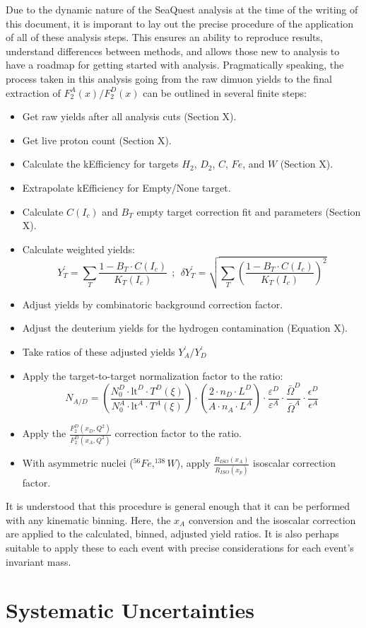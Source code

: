 Due to the dynamic nature of the SeaQuest analysis at the time of the writing of this document, it is imporant to lay out the precise procedure of the application of all of these analysis steps. This ensures an ability to reproduce results, understand differences between methods, and allows those new to analysis to have a roadmap for getting started with analysis. Pragmatically speaking, the process taken in this analysis going from the raw dimuon yields to the final extraction of $F_2^A(x)/F_2^D(x)$ can be outlined in several finite steps:
\begin{itemize}
	\item Get raw yields after all analysis cuts (Section X).
	\item Get live proton count (Section X).
	\item Calculate the kEfficiency for targets $H_2$, $D_2$, $C$, $Fe$, and $W$ (Section X).
	\item Extrapolate kEfficiency for Empty/None target.
	\item Calculate $C(I_c)$ and $B_T$ empty target correction fit and parameters (Section X).
	\item Calculate weighted yields:
	\begin{equation}
	Y_T^\prime = \sum\limits_T \frac{1 - B_T \cdot C(I_c)}{K_T(I_c)} \ \ ; \ \ \delta Y_T^\prime = \sqrt{\sum\limits_T \left(\frac{1 - B_T \cdot C(I_c)}{K_T(I_c)}\right)^2}
	\end{equation}
	\item {} Adjust yields by combinatoric background correction factor.
	\item Adjust the deuterium yields for the hydrogen contamination (Equation X).
	\item Take ratios of these adjusted yields $Y_A^\prime/Y_D^\prime$
	\item Apply the target-to-target normalization factor to the ratio:
	\begin{equation}
	N_{A/D} =
	\left(\frac{ N_0^D \cdot \text{lt}^D \cdot T^D(\xi)}{N_0^A \cdot \text{lt}^A \cdot T^A(\xi) } \right) \cdot 
	\left( \frac{ 2 \cdot n_D \cdot L^D }{ A \cdot n_A \cdot L^A } \right) \cdot 
	\frac{ \varepsilon^D }{ \varepsilon^A }  \cdot 
	\frac{ \bar{\Omega}^D }{\bar{ \Omega}^A } \cdot 
	\frac{ \epsilon^D }{ \epsilon^A }
	\end{equation}
	\item Apply the $\frac{F_2^D(x_D, Q^2)}{F_2^D(x_A, Q^2)}$ correction factor to the ratio.
	\item With asymmetric nuclei ($^{56}Fe, ^{138}W$), apply $\frac{R_{ISO}(x_A) }{R_{ISO}(x_p)}$ isoscalar correction factor.
\end{itemize}
It is understood that this procedure is general enough that it can be performed with any kinematic binning. Here, the $x_A$ conversion and the isoscalar correction are applied to the calculated, binned, adjusted yield ratios. It is also perhaps suitable to apply these to each event with precise considerations for each event's invariant mass.


\section{Systematic Uncertainties}
